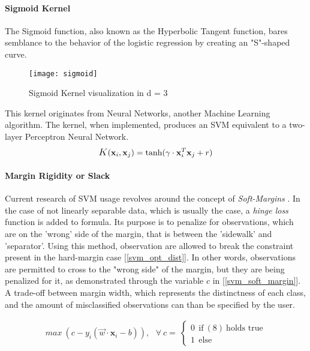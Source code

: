 \paragraph{Sigmoid Kernel}
	The Sigmoid function, also known as the Hyperbolic Tangent function, bares semblance to the behavior of the logistic regression by creating an "S"-shaped curve. 
	
	\begin{figure}[h]
		\centering
		\captionsetup{width=0.8\textwidth}
		\texttt{[image: sigmoid]}
		\caption[Sigmoid Kernel]{
			\footnotesize{
				Sigmoid Kernel visualization in d = 3
			}
		}
	\end{figure}
	
	This kernel originates from Neural Networks, another Machine Learning algorithm. The kernel, when implemented, produces an SVM equivalent to a two-layer Perceptron Neural Network.
	\begin{equation}
		\mathlarger{K}(\textbf{x}_i,\textbf{x}_j) = \text{tanh}(\gamma \cdot \textbf{x}^T_i \textbf{x}_j + r)
	\end{equation}
	


\paragraph{Margin Rigidity or Slack}
	Current research of SVM usage revolves around the concept of \textit{Soft-Margins} \cite{SVM_cortes1995support}. In the case of not linearly separable data, which is usually the case, a \textit{hinge loss} function is added to formula. Its purpose is to penalize for observations, which are on the 'wrong' side of the margin, that is between the 'sidewalk' and 'separator'. Using this method, observation are allowed to break the constraint present in the hard-margin case [\ref{svm_opt_dist}]. In other words, observations are permitted to cross to the "wrong side" of the margin, but they are being penalized for it, as demonstrated through the variable $c$ in [\ref{svm_soft_margin}]. A trade-off between margin width, which represents the distinctness of each class, and the amount of misclassified observations can than be specified by the user.

	\begin{equation}
		\begin{aligned}
			max \ (c - y_i(\vec{w} \cdot \textbf{x}_i - b)), 
			\  \ \ \forall \ c = \ 
			\begin{cases} 
				0 \ \ \text{if} \ (8) \ \text{holds true}\\
				1 \ \ \text{else}
			\end{cases}
		\end{aligned}
		\label{svm_soft_margin}
	\end{equation}


